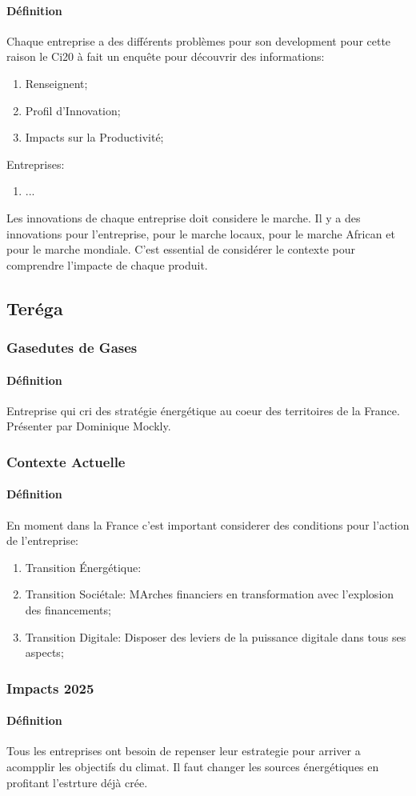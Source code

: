 \documentclass{article}
\begin{document}
\paragraph{Définition}Chaque entreprise a des différents problèmes pour son development pour cette raison le Ci20 à fait un enquête pour découvrir des informations:
\begin{enumerate}[noitemsep]
    \item Renseignent;
    \item Profil d'Innovation;
    \item Impacts sur la Productivité;
\end{enumerate}
\noindent Entreprises:
\begin{enumerate}[noitemsep]
    \item ...
\end{enumerate}
\noindent Les innovations de chaque entreprise doit considere le marche. Il y a des innovations pour l'entreprise, pour le marche locaux, pour le marche African et pour le marche mondiale. C'est essential de considérer le contexte pour comprendre l'impacte de chaque produit.\\

\newpage\subsection{Teréga}
\subsubsection{Gasedutes de Gases}
\paragraph{Définition}Entreprise qui cri des stratégie énergétique au coeur des territoires de la France. Présenter par Dominique Mockly.

\subsubsection{Contexte Actuelle}
\paragraph{Définition}En moment dans la France c'est important considerer des conditions pour l'action de l'entreprise:
\begin{enumerate}[noitemsep]
    \item Transition Énergétique:  
    \item Transition Sociétale: MArches financiers en transformation avec l'explosion des financements;
    \item Transition Digitale: Disposer des leviers de la puissance digitale dans tous ses aspects;
\end{enumerate}

\subsubsection{Impacts 2025}
\paragraph{Définition}Tous les entreprises ont besoin de repenser leur estrategie pour arriver a acompplir les objectifs du climat. Il faut changer les sources énergétiques en profitant l'estrture déjà crée.
\end{document}
